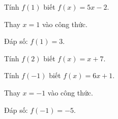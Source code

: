 \begin{problem}
Tính $f(1)$ biết $f(x) = 5x - 2$.

\begin{solution}
Thay $x = 1$ vào công thức.

Đáp số: $f(1) = 3$.
\end{solution}
\end{problem}

\begin{problem}[8DS-NEW-005]
Tính $f(2)$ biết $f(x) = x + 7$.
\end{problem}

\begin{problem}[8DS-NEW-001]
Tính $f(-1)$ biết $f(x) = 6x + 1$.

\begin{solution}
Thay $x = -1$ vào công thức.

Đáp số: $f(-1) = -5$.
\end{solution}
\end{problem}
